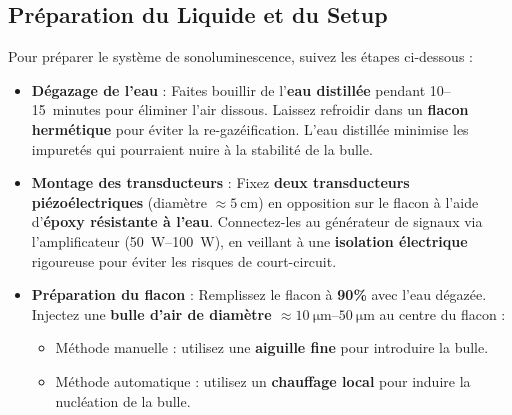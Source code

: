 \documentclass[a4paper,12pt]{article}
\begin{document}
\subsection{Préparation du Liquide et du Setup}
Pour préparer le système de sonoluminescence, suivez les étapes ci-dessous :
\begin{itemize}
    \item \textbf{Dégazage de l'eau} :
    Faites bouillir de l'\textbf{eau distillée} pendant 10--15~minutes pour éliminer l'air dissous.
    Laissez refroidir dans un \textbf{flacon hermétique} pour éviter la re-gazéification.
    L'eau distillée minimise les impuretés qui pourraient nuire à la stabilité de la bulle.

    \item \textbf{Montage des transducteurs} :
    Fixez \textbf{deux transducteurs piézoélectriques} (diamètre $\approx \SI{5}{\centi\meter}$) en opposition sur le flacon à l'aide d'\textbf{époxy résistante à l'eau}.
    Connectez-les au générateur de signaux via l'amplificateur (\SIrange{50}{100}{\watt}), en veillant à une \textbf{isolation électrique} rigoureuse pour éviter les risques de court-circuit.

    \item \textbf{Préparation du flacon} :
    Remplissez le flacon à \textbf{90\%} avec l'eau dégazée.
    Injectez une \textbf{bulle d'air de diamètre $\approx \SIrange{10}{50}{\micro\meter}$} au centre du flacon :
    \begin{itemize}
        \item Méthode manuelle : utilisez une \textbf{aiguille fine} pour introduire la bulle.
        \item Méthode automatique : utilisez un \textbf{chauffage local} pour induire la nucléation de la bulle.
    \end{itemize}
\end{itemize}
\end{document}
